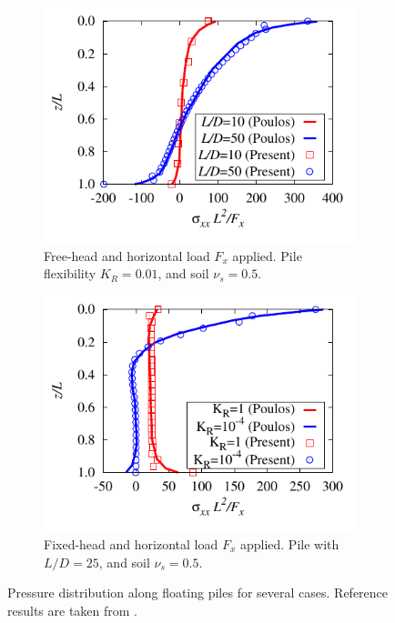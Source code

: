 \documentclass[a4]{article}
\begin{document}
\begin{figure}[tbh!]
	\begin{subfigure}[b]{0.48\textwidth}
		\centering
		\includegraphics[width=\textwidth]{floating_c.pdf}
		\caption{Free-head and horizontal load $F_x$ applied. Pile flexibility $K_R=0.01$, and soil $\nu_s=0.5$.}
		\label{fig:floating_results_c}
	\end{subfigure}
	\begin{subfigure}[b]{0.48\textwidth}
		\centering
		\includegraphics[width=\textwidth]{floating_d.pdf}
		\caption{Fixed-head and horizontal load $F_x$ applied. Pile with $L/D=25$, and soil $\nu_s=0.5$.}
		\label{fig:floating_results_d}
	\end{subfigure}    
	\caption{Pressure distribution along floating piles for several  cases. Reference results are taken from \cite{poulos}.}
	\label{fig:results}
\end{figure}
\end{document}
